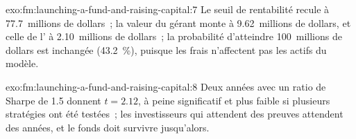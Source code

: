 \begin{solution}{exo:fm:launching-a-fund-and-raising-capital:7}
Le seuil de rentabilité recule à 77.7~millions de dollars~; la valeur du gérant monte à 9.62~millions de dollars, et celle de l' à 2.10~millions de dollars~; la probabilité
d'atteindre 100~millions de dollars est inchangée (43.2~\%), puisque les frais n'affectent pas les actifs du modèle.
\end{solution}

\begin{solution}{exo:fm:launching-a-fund-and-raising-capital:8}
Deux années avec un ratio de Sharpe de 1.5 donnent $t=2.12$, à peine significatif et plus faible si plusieurs stratégies ont été testées~; les investisseurs qui attendent des preuves attendent des années, et le
fonds doit survivre jusqu'alors.
\end{solution}


